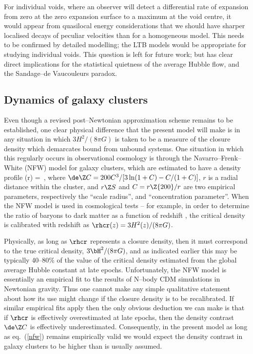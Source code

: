 \documentclass[12pt]{iopart}
\begin{document}
For individual voids, where an observer will detect a differential rate of
expansion from zero at the zero expansion surface to a maximum at the void
centre, it would appear from quasilocal energy considerations that we should
have sharper localised decays of peculiar velocities than for a homogeneous
model. This needs to be confirmed by detailed modelling; the LTB models would
be appropriate for studying individual voids. This question is left for future
work; but has clear direct implications for the statistical quietness of
the average Hubble flow, and the Sandage--de Vaucouleurs paradox.

\subsection{Dynamics of galaxy clusters\label{cluster}}

Even though a revised post--Newtonian approximation scheme remains to
be established, one clear physical difference that the present model
will make is in any situation in which $3H^2/(8\pi G)$ is taken to
be a measure of the closure density which demarcates bound from
unbound systems. One situation in which this regularly occurs in
observational cosmology is through the Navarro--Frenk--White (NFW) model
\cite{NFW} for galaxy clusters, which are estimated to have a density profile
\beq
\rh(r) = \,,\label{nfw}
\eeq
where
$\de\Z C = 200C^3/[3\ln(1+C) -C /(1+C)]$,
$r$ is a radial distance within the cluster, and $r\Z S$ and $C = r\Z{200}/r$
are two empirical parameters, respectively the ``scale radius'',
and ``concentration parameter''. When the NFW model is used
in cosmological tests -- for example, in order to determine the ratio of
baryons to dark matter as a function of redshift \cite{Allen}, the critical
density is calibrated with redshift as $\rhcr(z)=3H^2(z)/(8\pi G)$.

Physically, as long as $\rhcr$ represents a closure density, then
it must correspond to the true critical density, $3\bH^2/(8\pi G)$, and
as indicated earlier this may be typically 40--80\% of the value of
the critical density estimated from the global average Hubble constant
at late epochs.
Unfortunately, the NFW model is essentially an empirical fit to the
results of N--body CDM simulations in Newtonian gravity. Thus one cannot
make any simple qualitative statement about how its use might change
if the closure density is to be recalibrated. If similar empirical
fits apply then the only obvious deduction we can make is
that if $\rhcr$ is effectively overestimated at late epochs, then the
density contrast $\de\Z C$ is effectively underestimated.
Consequently, in the present model as long as eq.\ (\ref{nfw}) remains
empirically valid we would expect the density contrast in galaxy
clusters to be higher than is usually assumed.
\end{document}

